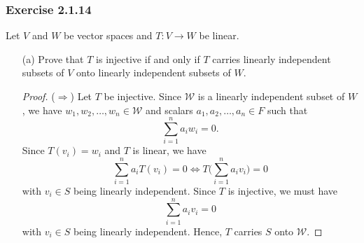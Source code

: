 \subsubsection{Exercise 2.1.14} \label{Exercise 2.1.14} Let \( V \) and \( W \) be vector spaces and \( T: V \to W  \) be linear.
\begin{enumerate}
    \item[(a)] Prove that \( T \) is injective if and only if \( T  \) carries linearly independent subsets of \( V  \) onto linearly independent subsets of \( W  \).
        \begin{proof}
            (\( \Rightarrow \)) Let \( T \) be injective. Since \( \mathcal{W} \) is a linearly independent subset of \( W  \), we have \( {w}_{1}, {w}_{2}, \dots, {w}_{n} \in \mathcal{W}  \) and scalars \( {a}_{1}, {a}_{2}, \dots, {a}_{n} \in F \) such that 
            \[  \sum_{ i=1 }^{ n } {a}_{i} {w}_{i} = 0. \]
            Since \( T({v}_{i}) = {w}_{i}  \) and \( T  \) is linear, we have
            \[ \sum_{ i=1 }^{ n } {a}_{i}T({v}_{i}) = 0 \iff T \Big( \sum_{ i=1 }^{ n } {a}_{i}{v}_{i} \Big) = 0  \]
            with \( {v}_{i} \in S  \) being linearly independent.
            Since \( T  \) is injective, we must have
            \[  \sum_{ i=1 }^{ n } {a}_{i} {v}_{i} = 0  \]
            with \( {v}_{i} \in S  \) being linearly independent.
            Hence, \( T  \) carries \( S  \) onto \( \mathcal{W} \).


\end{proof}
\end{enumerate}

